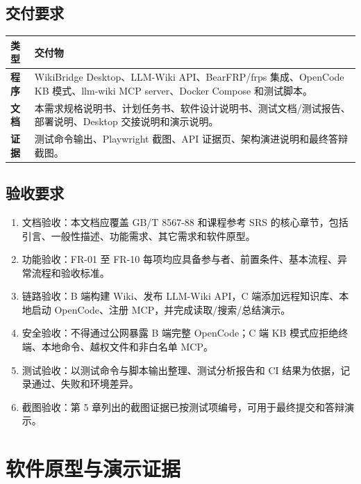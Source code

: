 \documentclass[UTF8,a4paper,12pt,fontset=fandol]{ctexart}
\begin{document}
\subsection{交付要求}
\begin{longtable}{>{\bfseries}p{3.2cm}p{11.0cm}}
\toprule
类型 & 交付物 \\
\midrule
程序 & WikiBridge Desktop、LLM-Wiki API、BearFRP/frps 集成、OpenCode KB 模式、llm-wiki MCP server、Docker Compose 和测试脚本。 \\
文档 & 本需求规格说明书、计划任务书、软件设计说明书、测试文档/测试报告、部署说明、Desktop 交接说明和演示说明。 \\
证据 & 测试命令输出、Playwright 截图、API 证据页、架构演进说明和最终答辩截图。 \\
\bottomrule
\end{longtable}

\subsection{验收要求}
\begin{enumerate}
  \item 文档验收：本文档应覆盖 GB/T 8567-88 和课程参考 SRS 的核心章节，包括引言、一般性描述、功能需求、其它需求和软件原型。
  \item 功能验收：FR-01 至 FR-10 每项均应具备参与者、前置条件、基本流程、异常流程和验收标准。
  \item 链路验收：B 端构建 Wiki、发布 LLM-Wiki API，C 端添加远程知识库、本地启动 OpenCode、注册 MCP，并完成读取/搜索/总结演示。
  \item 安全验收：不得通过公网暴露 B 端完整 OpenCode；C 端 KB 模式应拒绝终端、本地命令、越权文件和非白名单 MCP。
  \item 测试验收：以测试命令与脚本输出整理、测试分析报告和 CI 结果为依据，记录通过、失败和环境差异。
  \item 截图验收：第 5 章列出的截图证据已按测试项编号，可用于最终提交和答辩演示。
\end{enumerate}

\section{软件原型与演示证据}
\end{document}
